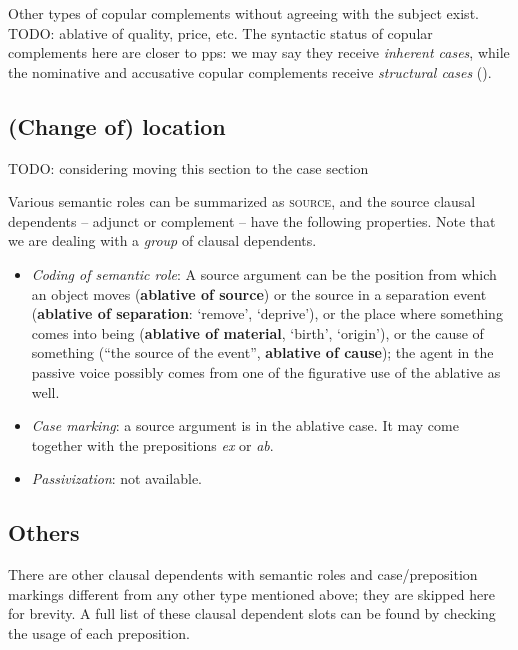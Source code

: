 \documentclass[a4paper, oneside]{report}
\newcommand*{\concept}[1]{\textbf{#1}}
\newcommand{\form}[1]{\emph{#1}}
\newcommand*{\category}[1]{\textsc{#1}}
\newcommand{\translate}[1]{`#1'}
\begin{document}
Other types of copular complements without agreeing with the subject exist.
TODO: ablative of quality, price, etc. 
The syntactic status of copular complements here are closer to \acs{pp}s:
we may say they receive \emph{inherent cases},
while the nominative and accusative copular complements 
receive \emph{structural cases} 
().

\subsection{(Change of) location}

TODO: considering moving this section to the case section

Various semantic roles can be summarized as \category{source}, 
and the source clausal dependents -- adjunct or complement -- have the following properties.
Note that we are dealing with a \emph{group} of clausal dependents.
\begin{itemize}
    \item \emph{Coding of semantic role}: 
        A source argument
        can be the position from which an object moves 
        (\concept{ablative of source})
        or the source in a separation event 
        (\concept{ablative of separation}: \translate{remove}, \translate{deprive}),
        or the place where something comes into being 
        (\concept{ablative of material}, \translate{birth}, \translate{origin}), 
        or the cause of something (``the source of the event'', \concept{ablative of cause});
        the agent in the passive voice possibly 
        comes from one of the figurative use of the ablative as well.
    \item \emph{Case marking}: a source argument is in the ablative case.
        It may come together with the prepositions \form{ex} or \form{ab}.
    \item \emph{Passivization}: not available.
\end{itemize}

\subsection{Others}

There are other clausal dependents with semantic roles and case/preposition markings 
different from any other type mentioned above;
they are skipped here for brevity.
A full list of these clausal dependent slots can be found by checking the usage of each preposition. 
\end{document}
